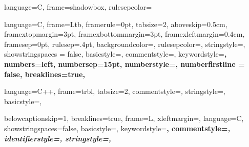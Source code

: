 {
  language=C,
  frame=shadowbox, 
  rulesepcolor=\color{blue}
}

{
  language=C,
  frame=Ltb,
  framerule=0pt,
  tabsize=2,
  aboveskip=0.5cm,
  framextopmargin=3pt,
  framexbottommargin=3pt,
  framexleftmargin=0.4cm,
  framesep=0pt,
  rulesep=.4pt,
  backgroundcolor=\color{gray97},
  rulesepcolor=\color{black},
  stringstyle=\ttfamily,
  showstringspaces = false,
  basicstyle=\footnotesize\ttfamily,
  commentstyle=\color{gray45},
  keywordstyle=\bfseries,
  numbers=left,
  numbersep=15pt,
  numberstyle=\tiny,
  numberfirstline = false,
  breaklines=true,
}	

{
  language=C++,
  frame=trbl,
  tabsize=2,
  commentstyle=\textit,
  stringstyle=\ttfamily, 
  basicstyle=\small,
}	

{
  belowcaptionskip=1\baselineskip,
  breaklines=true,
  frame=L,
  xleftmargin=\parindent,
  language=C,
  showstringspaces=false,
  basicstyle=\footnotesize\ttfamily,
  keywordstyle=\bfseries\color{green!40!black},
  commentstyle=\itshape\color{purple!40!black},
  identifierstyle=\color{blue},
  stringstyle=\color{orange},
}



\usepackage{sidecap}

